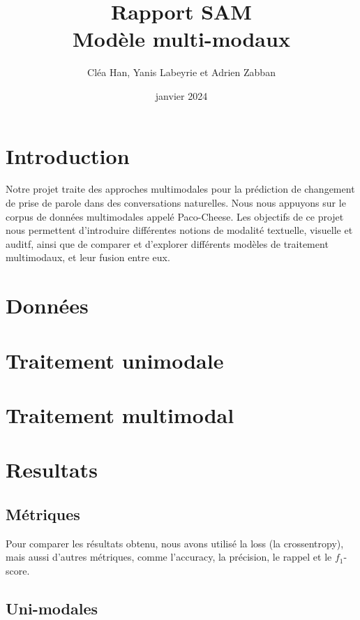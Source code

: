 \documentclass[a4paper]{article}
\title{Rapport SAM \\ Modèle multi-modaux}
\author{Cléa Han, Yanis Labeyrie et Adrien Zabban}
\date{janvier 2024}
\begin{document}
\maketitle

\section{Introduction}

Notre projet traite des approches multimodales pour la prédiction de changement de prise de parole dans des conversations naturelles. 
Nous nous appuyons sur le corpus de données multimodales appelé Paco-Cheese.
Les objectifs de ce projet nous permettent d'introduire différentes notions de modalité textuelle, visuelle et auditf, ainsi que de
comparer et d'explorer différents modèles de traitement multimodaux, et leur fusion entre eux.

\section{Données}



\section{Traitement unimodale}



\section{Traitement multimodal}



\section{Resultats}

\subsection{Métriques}

Pour comparer les résultats obtenu, nous avons utilisé la loss (la crossentropy), mais aussi d'autres métriques,
comme l'accuracy, la précision, le rappel et le $f_1$-score.

\subsection{Uni-modales}
\end{document}
